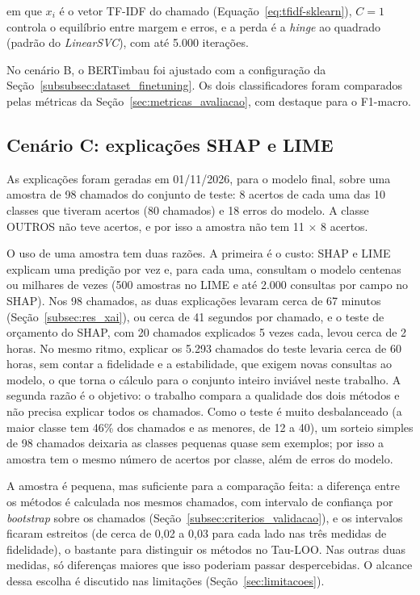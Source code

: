 \documentclass[
    12pt,                %
    openright,           %
    oneside,             %
    a4paper,             %
    english,             %
    brazil               %
]{abntex2}
\begin{document}
em que $x_i$ é o vetor TF-IDF do chamado (Equação~\ref{eq:tfidf-sklearn}), $C = 1$ controla o equilíbrio entre margem e erros, e a perda é a \textit{hinge} ao quadrado (padrão do \textit{LinearSVC}), com até 5.000 iterações.

No cenário B, o BERTimbau foi ajustado com a configuração da Seção~\ref{subsubsec:dataset_finetuning}. Os dois classificadores foram comparados pelas métricas da Seção~\ref{sec:metricas_avaliacao}, com destaque para o F1-macro.

\subsection{Cenário C: explicações SHAP e LIME}

As explicações foram geradas em 01/11/2026, para o modelo final, sobre uma amostra de 98 chamados do conjunto de teste: 8 acertos de cada uma das 10 classes que tiveram acertos (80 chamados) e 18 erros do modelo. A classe OUTROS não teve acertos, e por isso a amostra não tem 11 $\times$ 8 acertos.

O uso de uma amostra tem duas razões. A primeira é o custo: SHAP e LIME explicam uma predição por vez e, para cada uma, consultam o modelo centenas ou milhares de vezes (500 amostras no LIME e até 2.000 consultas por campo no SHAP). Nos 98 chamados, as duas explicações levaram cerca de 67 minutos (Seção~\ref{subsec:res_xai}), ou cerca de 41 segundos por chamado, e o teste de orçamento do SHAP, com 20 chamados explicados 5 vezes cada, levou cerca de 2 horas. No mesmo ritmo, explicar os 5.293 chamados do teste levaria cerca de 60 horas, sem contar a fidelidade e a estabilidade, que exigem novas consultas ao modelo, o que torna o cálculo para o conjunto inteiro inviável neste trabalho. A segunda razão é o objetivo: o trabalho compara a qualidade dos dois métodos e não precisa explicar todos os chamados. Como o teste é muito desbalanceado (a maior classe tem 46\% dos chamados e as menores, de 12 a 40), um sorteio simples de 98 chamados deixaria as classes pequenas quase sem exemplos; por isso a amostra tem o mesmo número de acertos por classe, além de erros do modelo.

A amostra é pequena, mas suficiente para a comparação feita: a diferença entre os métodos é calculada nos mesmos chamados, com intervalo de confiança por \textit{bootstrap} sobre os chamados (Seção~\ref{subsec:criterios_validacao}), e os intervalos ficaram estreitos (de cerca de 0,02 a 0,03 para cada lado nas três medidas de fidelidade), o bastante para distinguir os métodos no Tau-LOO. Nas outras duas medidas, só diferenças maiores que isso poderiam passar despercebidas. O alcance dessa escolha é discutido nas limitações (Seção~\ref{sec:limitacoes}).
\end{document}
